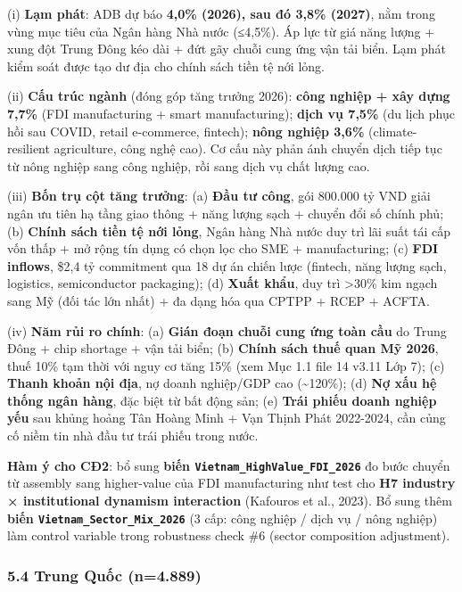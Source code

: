\documentclass[12pt,a4paper]{article}
\begin{document}
(i) \textbf{Lạm phát}: ADB dự báo \textbf{4,0\% (2026), sau đó 3,8\%
(2027)}, nằm trong vùng mục tiêu của Ngân hàng Nhà nước (≤4,5\%). Áp lực
từ giá năng lượng + xung đột Trung Đông kéo dài + đứt gãy chuỗi cung ứng
vận tải biển. Lạm phát kiểm soát được tạo dư địa cho chính sách tiền tệ
nới lỏng.

(ii) \textbf{Cấu trúc ngành} (đóng góp tăng trưởng 2026): \textbf{công
nghiệp + xây dựng 7,7\%} (FDI manufacturing + smart manufacturing);
\textbf{dịch vụ 7,5\%} (du lịch phục hồi sau COVID, retail e-commerce,
fintech); \textbf{nông nghiệp 3,6\%} (climate-resilient agriculture,
công nghệ cao). Cơ cấu này phản ánh chuyển dịch tiếp tục từ nông nghiệp
sang công nghiệp, rồi sang dịch vụ chất lượng cao.

(iii) \textbf{Bốn trụ cột tăng trưởng}: (a) \textbf{Đầu tư công}, gói
800.000 tỷ VND giải ngân ưu tiên hạ tầng giao thông + năng lượng sạch +
chuyển đổi số chính phủ; (b) \textbf{Chính sách tiền tệ nới lỏng}, Ngân
hàng Nhà nước duy trì lãi suất tái cấp vốn thấp + mở rộng tín dụng có
chọn lọc cho SME + manufacturing; (c) \textbf{FDI inflows}, \$2,4 tỷ
commitment qua 18 dự án chiến lược (fintech, năng lượng sạch, logistics,
semiconductor packaging); (d) \textbf{Xuất khẩu}, duy trì
\textgreater30\% kim ngạch sang Mỹ (đối tác lớn nhất) + đa dạng hóa qua
CPTPP + RCEP + ACFTA.

(iv) \textbf{Năm rủi ro chính}: (a) \textbf{Gián đoạn chuỗi cung ứng
toàn cầu} do Trung Đông + chip shortage + vận tải biển; (b)
\textbf{Chính sách thuế quan Mỹ 2026}, thuế 10\% tạm thời với nguy cơ
tăng 15\% (xem Mục 1.1 file 14 v3.11 Lớp 7); (c) \textbf{Thanh khoản nội
địa}, nợ doanh nghiệp/GDP cao (\textasciitilde120\%); (d) \textbf{Nợ xấu
hệ thống ngân hàng}, đặc biệt từ bất động sản; (e) \textbf{Trái phiếu
doanh nghiệp yếu} sau khủng hoảng Tân Hoàng Minh + Vạn Thịnh Phát
2022-2024, cần củng cố niềm tin nhà đầu tư trái phiếu trong nước.

\textbf{Hàm ý cho CĐ2}: bổ sung \textbf{biến
\texttt{Vietnam\_HighValue\_FDI\_2026}} đo bước chuyển từ assembly sang
higher-value của FDI manufacturing như test cho \textbf{H7 industry ×
institutional dynamism interaction} (Kafouros et al., 2023). Bổ sung
thêm \textbf{biến \texttt{Vietnam\_Sector\_Mix\_2026}} (3 cấp: công
nghiệp / dịch vụ / nông nghiệp) làm control variable trong robustness
check \#6 (sector composition adjustment).

\hypertarget{54-trung-quux1ed1c-n4889}{%
\subsubsection{5.4 Trung Quốc
(n=4.889)}\label{54-trung-quux1ed1c-n4889}}
\end{document}
